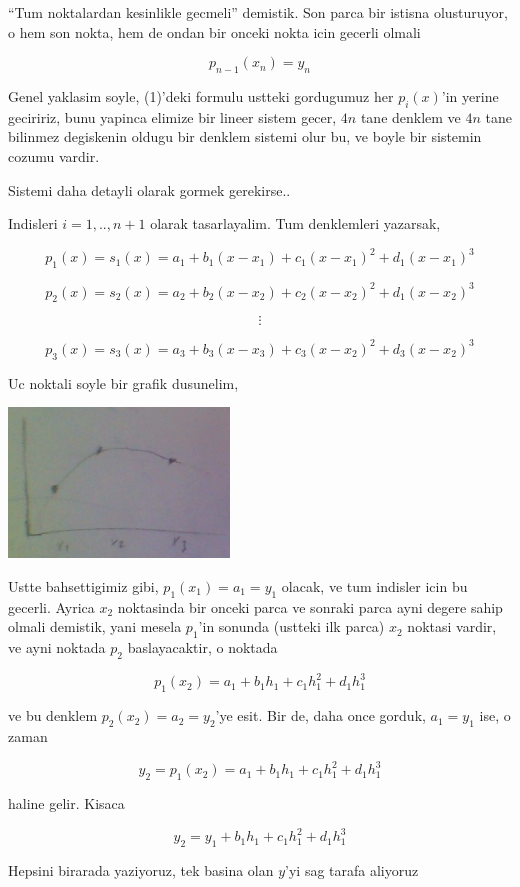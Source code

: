 \documentclass[12pt,fleqn]{article}\usepackage{../common}
\begin{document}
``Tum noktalardan kesinlikle gecmeli'' demistik. Son parca bir istisna
olusturuyor, o hem son nokta, hem de ondan bir onceki nokta icin gecerli
olmali

\[ p_{n-1}(x_n) = y_n \]

Genel yaklasim soyle, (1)'deki formulu ustteki gordugumuz her $p_i(x)$'in
yerine geciririz, bunu yapinca elimize bir lineer sistem gecer, $4n$ tane
denklem ve $4n$ tane bilinmez degiskenin oldugu bir denklem sistemi olur
bu, ve boyle bir sistemin cozumu vardir.

Sistemi daha detayli olarak gormek gerekirse..

Indisleri $i=1,..,n+1$ olarak tasarlayalim. Tum denklemleri yazarsak,

\[ p_1(x) = s_1(x) = a_1 + b_1(x-x_1) + c_1(x-x_1)^2 + d_1(x-x_1)^3\]

\[ p_2(x) = s_2(x) = a_2 + b_2(x-x_2) + c_2(x-x_2)^2 + d_1(x-x_2)^3\]

\[ \vdots \]

\[ p_3(x) = s_3(x) = a_3 + b_3(x-x_3) + c_3(x-x_2)^2 + d_3(x-x_2)^3\]

Uc noktali soyle bir grafik dusunelim,

\includegraphics[height=4cm]{spline2.png}

Ustte bahsettigimiz gibi, $p_1(x_1) = a_1 = y_1$ olacak, ve tum indisler
icin bu gecerli. Ayrica $x_2$ noktasinda bir onceki parca ve sonraki parca
ayni degere sahip olmali demistik, yani mesela $p_1$'in sonunda (ustteki
ilk parca) $x_2$ noktasi vardir, ve ayni noktada $p_2$ baslayacaktir, o
noktada 

\[ p_1(x_2) = a_1 + b_1h_1 + c_1h_1^2 + d_1h_1^3  \]

ve bu denklem $p_2(x_2) = a_2 = y_2$'ye esit. Bir de, daha once gorduk, $a_1 =
y_1$ 
ise, o zaman 

\[ y_2 = p_1(x_2) = a_1 + b_1h_1 + c_1h_1^2 + d_1h_1^3 \]

haline gelir. Kisaca

\[ y_2 =  y_1 + b_1h_1 + c_1h_1^2 + d_1h_1^3 \]

Hepsini birarada yaziyoruz, tek basina olan $y$'yi sag tarafa aliyoruz
\end{document}
